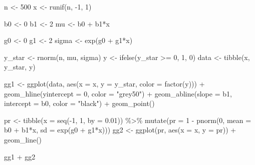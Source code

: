 \documentclass[
]{book}
\newenvironment{Shaded}{\begin{snugshade}}{\end{snugshade}}
\newcommand{\AttributeTok}[1]{\textcolor[rgb]{0.77,0.63,0.00}{#1}}
\newcommand{\DecValTok}[1]{\textcolor[rgb]{0.00,0.00,0.81}{#1}}
\newcommand{\FloatTok}[1]{\textcolor[rgb]{0.00,0.00,0.81}{#1}}
\newcommand{\FunctionTok}[1]{\textcolor[rgb]{0.00,0.00,0.00}{#1}}
\newcommand{\NormalTok}[1]{#1}
\newcommand{\OtherTok}[1]{\textcolor[rgb]{0.56,0.35,0.01}{#1}}
\newcommand{\SpecialCharTok}[1]{\textcolor[rgb]{0.00,0.00,0.00}{#1}}
\newcommand{\StringTok}[1]{\textcolor[rgb]{0.31,0.60,0.02}{#1}}
\begin{document}
\begin{Shaded}
\begin{Highlighting}[]
\NormalTok{n }\OtherTok{\textless{}{-}} \DecValTok{500}
\NormalTok{x }\OtherTok{\textless{}{-}} \FunctionTok{runif}\NormalTok{(n, }\SpecialCharTok{{-}}\DecValTok{1}\NormalTok{, }\DecValTok{1}\NormalTok{)}

\NormalTok{b0 }\OtherTok{\textless{}{-}} \DecValTok{0}
\NormalTok{b1 }\OtherTok{\textless{}{-}} \DecValTok{2}
\NormalTok{mu }\OtherTok{\textless{}{-}}\NormalTok{ b0 }\SpecialCharTok{+}\NormalTok{ b1}\SpecialCharTok{*}\NormalTok{x}

\NormalTok{g0 }\OtherTok{\textless{}{-}} \DecValTok{0}
\NormalTok{g1 }\OtherTok{\textless{}{-}} \DecValTok{2}
\NormalTok{sigma }\OtherTok{\textless{}{-}} \FunctionTok{exp}\NormalTok{(g0 }\SpecialCharTok{+}\NormalTok{ g1}\SpecialCharTok{*}\NormalTok{x)}

\NormalTok{y\_star }\OtherTok{\textless{}{-}} \FunctionTok{rnorm}\NormalTok{(n, mu, sigma)}
\NormalTok{y }\OtherTok{\textless{}{-}} \FunctionTok{ifelse}\NormalTok{(y\_star }\SpecialCharTok{\textgreater{}=} \DecValTok{0}\NormalTok{, }\DecValTok{1}\NormalTok{, }\DecValTok{0}\NormalTok{)}
\NormalTok{data }\OtherTok{\textless{}{-}} \FunctionTok{tibble}\NormalTok{(x, y\_star, y)}

\NormalTok{gg1 }\OtherTok{\textless{}{-}} \FunctionTok{ggplot}\NormalTok{(data, }\FunctionTok{aes}\NormalTok{(}\AttributeTok{x =}\NormalTok{ x, }\AttributeTok{y =}\NormalTok{ y\_star, }\AttributeTok{color =} \FunctionTok{factor}\NormalTok{(y))) }\SpecialCharTok{+} 
  \FunctionTok{geom\_hline}\NormalTok{(}\AttributeTok{yintercept =} \DecValTok{0}\NormalTok{, }\AttributeTok{color =} \StringTok{"grey50"}\NormalTok{) }\SpecialCharTok{+}
  \FunctionTok{geom\_abline}\NormalTok{(}\AttributeTok{slope =}\NormalTok{ b1, }\AttributeTok{intercept =}\NormalTok{ b0, }\AttributeTok{color =} \StringTok{"black"}\NormalTok{) }\SpecialCharTok{+} 
  \FunctionTok{geom\_point}\NormalTok{() }

\NormalTok{pr }\OtherTok{\textless{}{-}} \FunctionTok{tibble}\NormalTok{(}\AttributeTok{x =} \FunctionTok{seq}\NormalTok{(}\SpecialCharTok{{-}}\DecValTok{1}\NormalTok{, }\DecValTok{1}\NormalTok{, }\AttributeTok{by =} \FloatTok{0.01}\NormalTok{)) }\SpecialCharTok{\%\textgreater{}\%}
  \FunctionTok{mutate}\NormalTok{(}\AttributeTok{pr =} \DecValTok{1} \SpecialCharTok{{-}} \FunctionTok{pnorm}\NormalTok{(}\DecValTok{0}\NormalTok{, }\AttributeTok{mean =}\NormalTok{ b0 }\SpecialCharTok{+}\NormalTok{ b1}\SpecialCharTok{*}\NormalTok{x, }\AttributeTok{sd =} \FunctionTok{exp}\NormalTok{(g0 }\SpecialCharTok{+}\NormalTok{ g1}\SpecialCharTok{*}\NormalTok{x)))}
\NormalTok{gg2 }\OtherTok{\textless{}{-}} \FunctionTok{ggplot}\NormalTok{(pr, }\FunctionTok{aes}\NormalTok{(}\AttributeTok{x =}\NormalTok{ x, }\AttributeTok{y =}\NormalTok{ pr)) }\SpecialCharTok{+} 
  \FunctionTok{geom\_line}\NormalTok{()}

\NormalTok{gg1 }\SpecialCharTok{+}\NormalTok{ gg2}
\end{Highlighting}
\end{Shaded}
\end{document}
